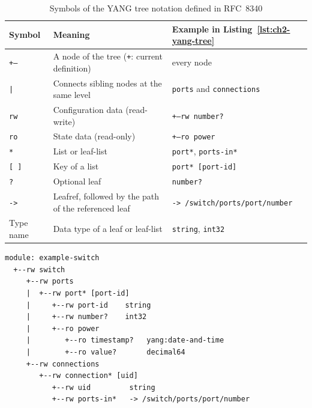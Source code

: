\begin{table}[H]
    \centering
    \small
    \caption{Symbols of the YANG tree notation defined in RFC~8340}
    \label{tab:ch2-yang-tree-notation}
    \begin{tabular}{lll}
        \toprule
        \textbf{Symbol} & \textbf{Meaning}                                     & \textbf{Example in Listing~\ref{lst:ch2-yang-tree}} \\
        \midrule
        \texttt{+--}    & A node of the tree (\texttt{+}: current definition)  & every node                                          \\
        \texttt{|}      & Connects sibling nodes at the same level             & \texttt{ports} and \texttt{connections}             \\
        \texttt{rw}     & Configuration data (read-write)                      & \texttt{+--rw number?}                              \\
        \texttt{ro}     & State data (read-only)                               & \texttt{+--ro power}                                \\
        \texttt{*}      & List or leaf-list                                    & \texttt{port*}, \texttt{ports-in*}                  \\
        \texttt{[ ]}    & Key of a list                                        & \texttt{port* [port-id]}                            \\
        \texttt{?}      & Optional leaf                                        & \texttt{number?}                                    \\
        \texttt{->}     & Leafref, followed by the path of the referenced leaf & \texttt{-> /switch/ports/port/number}               \\
        Type name       & Data type of a leaf or leaf-list                     & \texttt{string}, \texttt{int32}                     \\
        \bottomrule
    \end{tabular}
\end{table}

\begin{lstlisting}[language={}, keepspaces=true, caption={YANG tree diagram of the module in Listing~\ref{lst:ch2-yang-example}.}, label={lst:ch2-yang-tree}]
module: example-switch
  +--rw switch
     +--rw ports
     |  +--rw port* [port-id]
     |     +--rw port-id    string
     |     +--rw number?    int32
     |     +--ro power
     |        +--ro timestamp?   yang:date-and-time
     |        +--ro value?       decimal64
     +--rw connections
        +--rw connection* [uid]
           +--rw uid         string
           +--rw ports-in*   -> /switch/ports/port/number
\end{lstlisting}

